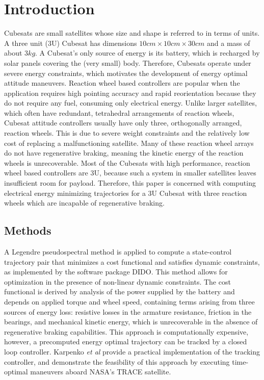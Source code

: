\documentclass[letterpaper, paper,11pt]{AAS}
\begin{document}
\section{Introduction}
Cubesats are small satellites whose size and shape is referred to in terms of units. A three unit (3U) Cubesat has dimensions $10cm \times 10cm \times 30cm$ and a mass of about $3kg$. A Cubesat's only source of energy is its battery, which is recharged by solar panels covering the (very small) body. Therefore, Cubesats operate under severe energy constraints, which motivates the development of energy optimal attitude maneuvers. Reaction wheel based controllers are popular when the application requires high pointing accuracy and rapid reorientation because they do not require any fuel, consuming only electrical energy. Unlike larger satellites, which often have redundant, tetrahedral arrangements of reaction wheels, Cubesat attitude controllers usually have only three, orthogonally arranged, reaction wheels. This is due to severe weight constraints and the relatively low cost of replacing a malfunctioning satellite. Many of these reaction wheel arrays do not have regenerative braking, meaning the kinetic energy of the reaction wheels is unrecoverable. Most of the Cubesats with high performance, reaction wheel based controllers are 3U, because such a system in smaller satellites leaves insufficient room for payload. Therefore, this paper is concerned with computing electrical energy minimizing trajectories for a 3U Cubesat with three reaction wheels which are incapable of regenerative braking.

\subsection{Methods}
A Legendre pseudospectral method \cite{Ross2012} is applied to compute a state-control trajectory pair that minimizes a cost functional and satisfies dynamic constraints, as implemented by the software package DIDO\cite{Ross2007}. This method allows for optimization in the presence of non-linear dynamic constraints. The cost functional is derived by analysis of the power supplied by the battery and depends on applied torque and wheel speed, containing terms arising from three sources of energy loss: resistive losses in the armature resistance, friction in the bearings, and mechanical kinetic energy, which is unrecoverable in the absence of regenerative braking capabilities. This approach is computationally expensive, however, a precomputed energy optimal trajectory can be tracked by a closed loop controller. Karpenko \textit{et al} provide a practical implementation of the tracking controller, and demonstrate the feasibility of this approach by executing time-optimal maneuvers aboard NASA's TRACE satellite. \cite{Karpenko2014}
\end{document}
